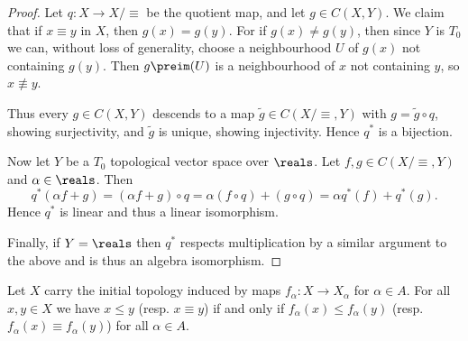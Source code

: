 \documentclass[article, a4paper, 11pt, oneside]{memoir}
\numberwithin{equation}{chapter}
\begin{document}
\begin{proof}
    Let $q \colon X \to X/{\equiv}$ be the quotient map, and let $g \in C(X,Y)$. We claim that if $x \equiv y$ in $X$, then $g(x) = g(y)$. For if $g(x) \neq g(y)$, then since $Y$ is $T_0$ we can, without loss of generality, choose a neighbourhood $U$ of $g(x)$ not containing $g(y)$. Then $g\preim(U)$ is a neighbourhood of $x$ not containing $y$, so $x \not\equiv y$.

    Thus every $g \in C(X,Y)$ descends to a map $\tilde{g} \in C(X/{\equiv},Y)$ with $g = \tilde{g} \circ q$, showing surjectivity, and $\tilde{g}$ is unique, showing injectivity. Hence $q^*$ is a bijection.

    Now let $Y$ be a $T_0$ topological vector space over $\reals$. Let $f,g \in C(X/{\equiv},Y)$ and $\alpha \in \reals$. Then
    \begin{equation*}
        q^*(\alpha f + g)
            = (\alpha f + g) \circ q
            = \alpha (f \circ q) + (g \circ q)
            = \alpha q^*(f) + q^*(g).
    \end{equation*}
    Hence $q^*$ is linear and thus a linear isomorphism.

    Finally, if $Y = \reals$ then $q^*$ respects multiplication by a similar argument to the above and is thus an algebra isomorphism.
\end{proof}


\begin{proposition}
    \label{prop:specialisation-preorder-initial-topology}
    Let $X$ carry the initial topology induced by maps $f_\alpha \colon X \to X_\alpha$ for $\alpha \in A$. For all $x,y \in X$ we have $x \leq y$ (resp. $x \equiv y$) if and only if $f_\alpha(x) \leq f_\alpha(y)$ (resp. $f_\alpha(x) \equiv f_\alpha(y)$) for all $\alpha \in A$.
\end{proposition}
\end{document}
